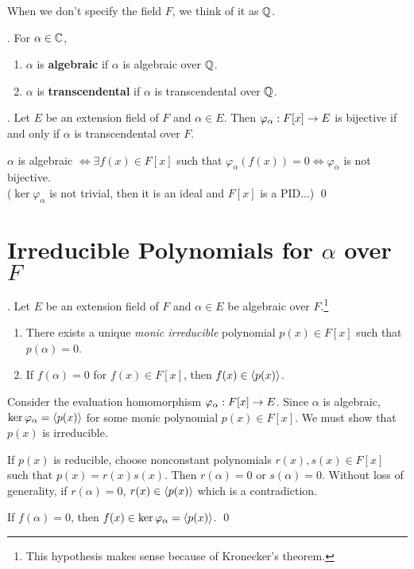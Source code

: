 When we don't specify the field \(F\), we think of it as \(\mathbb{Q}\).

. For \(\alpha \in \mathbb{C}\),
\begin{enumerate}
    \item \(\alpha\) is \textbf{algebraic} if \(\alpha\) is algebraic over \(\mathbb{Q}\).
    \item \(\alpha\) is \textbf{transcendental} if \(\alpha\) is transcendental over \(\mathbb{Q}\).
\end{enumerate}

\thm. Let \(E\) be an extension field of \(F\) and \(\alpha \in E\). Then \(\varphi_\alpha : F[x] \rightarrow E\) is bijective if and only if \(\alpha\) is transcendental over \(F\).

\pf \(\alpha\) is algebraic \(\iff \exists f(x) \in F[x]\) such that \(\varphi_\alpha(f(x)) = 0 \iff \varphi_\alpha\) is not bijective.\\
(\(\ker \varphi_\alpha\) is not trivial, then it is an ideal and \(F[x]\) is a PID...) \qed

\section*{Irreducible Polynomials for \(\alpha\) over \(F\)}

\thm. Let \(E\) be an extension field of \(F\) and \(\alpha \in E\) be algebraic over \(F\).\footnote{This hypothesis makes sense because of Kronecker's theorem.}
\begin{enumerate}
    \item There exists a unique \textit{monic irreducible} polynomial \(p(x) \in F[x]\) such that \(p(\alpha) = 0\).
    \item If \(f(\alpha) = 0\) for \(f(x) \in F[x]\), then \(f(x) \in \left\langle p(x) \right\rangle\).
\end{enumerate}

\pf Consider the evaluation homomorphism \(\varphi_\alpha : F[x] \rightarrow E\). Since \(\alpha\) is algebraic, \(\ker \varphi_\alpha = \left\langle p(x) \right\rangle\) for some monic polynomial \(p(x) \in F[x]\). We must show that \(p(x)\) is irreducible.

 If \(p(x)\) is reducible, choose nonconstant polynomials \(r(x), s(x) \in F[x]\) such that \(p(x) = r(x)s(x)\). Then \(r(\alpha) = 0\) or \(s(\alpha) = 0\). Without loss of generality, if \(r(\alpha) = 0\), \(r(x) \in \left\langle p(x) \right\rangle\) which is a contradiction.

 If \(f(\alpha) = 0\), then \(f(x) \in \ker\varphi_\alpha = \left\langle p(x) \right\rangle\). \qed

